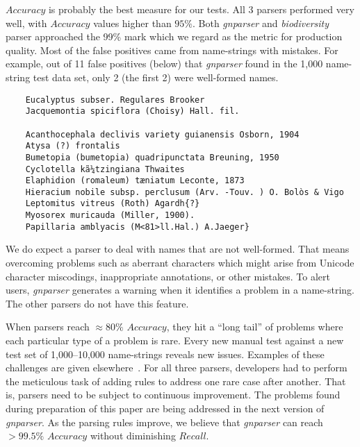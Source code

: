 \documentclass{bmcart}
\makeatletter
\newcommand{\verbatimfont}[1]{\def\verbatim@font{#1}}%
\makeatother
\begin{document}
$Accuracy$ is probably the best measure for our tests. All 3 parsers performed very well, with $Accuracy$ values higher than $95\%$. Both \textit{gnparser} and \textit{biodiversity} parser approached the 99\% mark which we regard as the metric for production quality. Most of the false positives came from name-strings with mistakes. For example, out of 11 false positives (below) that \textit{gnparser} found in the 1,000 name-string test data set, only 2 (the first 2) were well-formed names.

\vspace{0.5cm}

\verbatimfont{\bfseries\rmfamily\small}

\begin{verbatim}
    Eucalyptus subser. Regulares Brooker
    Jacquemontia spiciflora (Choisy) Hall. fil.

    Acanthocephala declivis variety guianensis Osborn, 1904
    Atysa (?) frontalis
    Bumetopia (bumetopia) quadripunctata Breuning, 1950
    Cyclotella kã¼tzingiana Thwaites
    Elaphidion (romaleum) tæniatum Leconte, 1873
    Hieracium nobile subsp. perclusum (Arv. -Touv. ) O. Bolòs & Vigo
    Leptomitus vitreus (Roth) Agardh{?}
    Myosorex muricauda (Miller, 1900).
    Papillaria amblyacis (M<81>ll.Hal.) A.Jaeger}
\end{verbatim}

\vspace{0.5cm}

We do expect a parser to deal with names that are not well-formed. That means overcoming problems such as aberrant characters which might arise from Unicode character miscodings, inappropriate annotations, or other mistakes. To alert users, \textit{gnparser} generates a warning when it identifies a problem in a name-string. The other parsers do not have this feature.

When parsers reach $\approx80\%$ $Accuracy$, they hit a ``long tail'' of problems where each particular type of a problem is rare. Every new manual test against a new test set of 1,000--10,000 name-strings reveals new issues.  Examples of these challenges are given elsewhere~\cite{Patterson2016}.  For all three parsers, developers had to perform the meticulous task of adding rules to address one rare case after another. That is, parsers need to be subject to continuous improvement. The problems found during preparation of this paper are being addressed in the next version of \textit{gnparser}. As the parsing rules improve, we believe that \textit{gnparser} can reach $>99.5\%$ $Accuracy$ without diminishing $Recall$.
\end{document}

